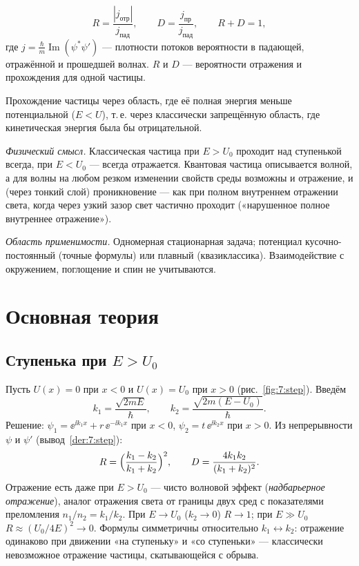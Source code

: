 \begin{definition}
\begin{equation}\label{eq:7:RD}
  R=\frac{|j_{\text{отр}}|}{j_{\text{пад}}},\qquad D=\frac{j_{\text{пр}}}{j_{\text{пад}}},\qquad R+D=1,
\end{equation}
где $j=\frac{\hbar}{m}\operatorname{Im}(\psi^*\psi')$ — плотности потоков вероятности в падающей,
отражённой и прошедшей волнах. $R$ и $D$ — вероятности отражения и прохождения для одной частицы.
\end{definition}

\begin{definition}
Прохождение частицы через область, где её полная энергия меньше потенциальной ($E<U$),
т.\,е. через классически запрещённую область, где кинетическая энергия была бы отрицательной.
\end{definition}

\emph{Физический смысл.} Классическая частица при $E>U_0$ проходит над ступенькой всегда, при
$E<U_0$ — всегда отражается. Квантовая частица описывается волной, а для волны на любом
резком изменении свойств среды возможны и отражение, и (через тонкий слой) проникновение —
как при полном внутреннем отражении света, когда через узкий зазор свет частично проходит
(«нарушенное полное внутреннее отражение»).

\emph{Область применимости.} Одномерная стационарная задача; потенциал кусочно-постоянный
(точные формулы) или плавный (квазиклассика). Взаимодействие с окружением, поглощение и
спин не учитываются.

\section{Основная теория}

\subsection{Ступенька при $E>U_0$}

Пусть $U(x)=0$ при $x<0$ и $U(x)=U_0$ при $x>0$ (рис.~\ref{fig:7:step}). Введём
\[
  k_1=\frac{\sqrt{2mE}}{\hbar},\qquad k_2=\frac{\sqrt{2m(E-U_0)}}{\hbar}.
\]
Решение: $\psi_1=\ee^{\ii k_1x}+r\,\ee^{-\ii k_1x}$ при $x<0$, $\psi_2=t\,\ee^{\ii k_2x}$ при $x>0$.
Из непрерывности $\psi$ и $\psi'$ (вывод~\ref{der:7:step}):
\begin{equation}\label{eq:7:stepRD}
  R=\Bigl(\frac{k_1-k_2}{k_1+k_2}\Bigr)^2,\qquad D=\frac{4k_1k_2}{(k_1+k_2)^2}.
\end{equation}
Отражение есть даже при $E>U_0$ — чисто волновой эффект (\emph{надбарьерное отражение}),
аналог отражения света от границы двух сред с показателями преломления $n_1/n_2=k_1/k_2$.
При $E\to U_0$ ($k_2\to0$) $R\to1$; при $E\gg U_0$ $R\approx(U_0/4E)^2\to0$. Формулы симметричны
относительно $k_1\leftrightarrow k_2$: отражение одинаково при движении «на ступеньку» и «со ступеньки» —
классически невозможное отражение частицы, скатывающейся с обрыва.

